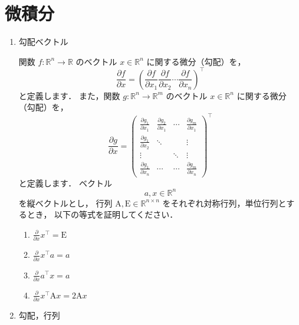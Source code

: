 \section{微積分}

\begin{enumerate}[label=問\arabic*.]
  \vspace{2mm}
  \item 勾配ベクトル

    \vspace{1mm}
    関数 $f: \mathbb{R}^n \rightarrow \mathbb{R}$ のベクトル $x \in \mathbb{R}^n$ に関する微分（勾配）を，
    \begin{equation}
      \frac{\partial f}{\partial x} = \left(
        \frac{\partial f}{\partial x_1} \frac{\partial f}{\partial x_2} \cdots \frac{\partial f}{\partial x_n}
        \right)^\top
    \end{equation}
    と定義します．
    また，関数 $g: \mathbb{R}^n \rightarrow \mathbb{R}^m$ のベクトル $x \in \mathbb{R}^n$ に関する微分（勾配）を，
    \begin{equation}
      \frac{\partial g}{\partial x} = \left(
        \begin{array}{rrrr}
          \frac{\partial g_1}{\partial x_1} & \frac{\partial g_2}{\partial x_1} & \cdots & \frac{\partial g_m}{\partial x_1} \\
          \frac{\partial g_1}{\partial x_2} & \ddots & & \vdots \\
          \vdots & & \ddots & \vdots \\
          \frac{\partial g_1}{\partial x_n} & \cdots & \cdots & \frac{\partial g_m}{\partial x_n}
        \end{array}
        \right)^\top
    \end{equation}
    と定義します．
    ベクトル $$a, x \in \mathbb{R}^n$$ を縦ベクトルとし，
    行列 $\mathrm{A}, \mathrm{E} \in \mathbb{R}^{n \times n}$ をそれぞれ対称行列，単位行列とするとき，
    以下の等式を証明してください．
    \begin{enumerate}[label=(\roman*)]
      \item $\frac{\partial}{\partial x} x^\top = \mathrm{E}$
      \item $\frac{\partial}{\partial x} x^\top a = a$
      \item $\frac{\partial}{\partial x} a^\top x = a$
      \item $\frac{\partial}{\partial x} x^\top \mathrm{A} x = 2 \mathrm{A} x$
    \end{enumerate}
  \item 勾配，行列


\end{enumerate}
